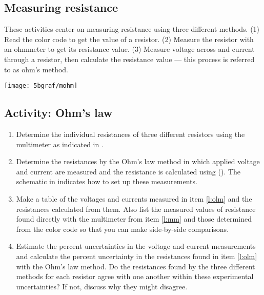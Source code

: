 \begin{multicols}{2}
\section {Measuring resistance}
These activities center on measuring resistance using three different methods. (1) Read the color code to get the value of a resistor. (2) Measure the resistor with an ohmmeter to get  its resistance value. (3) Measure voltage across and current through a resistor, then calculate the resistance value --- this process is  referred to as ohm's method.


\begin{center}
	\texttt{[image: 5bgraf/mohm]} %
	\label{f:mohm}
\end{center}

\subsection{Activity: Ohm's law} \label{s:ohmlaw}
\begin{enumerate}
	\item \label{l:mm} Determine the individual resistances of three different resistors using the multimeter as indicated in .
	
	\item \label{l:olm}Determine the resistances by the Ohm's law method in which applied voltage and current are measured and the resistance is calculated using  ().  The schematic in  indicates how to set up these measurements.

	\item Make a table of the voltages and currents measured in item \ref{l:olm} and the resistances calculated from them.  Also list the measured values of resistance found directly with the multimeter from item \ref{l:mm} and those determined from the color code so that you can make side-by-side comparisons.

	\item Estimate the percent uncertainties in the voltage and current measurements and calculate the percent uncertainty in the resistances found in item \ref{l:olm} with the Ohm's law method.  Do the resistances found by the three different methods for each resistor agree with one another within these experimental uncertainties? If not, discuss why they might disagree.
	

\end{enumerate}
\end{multicols}
